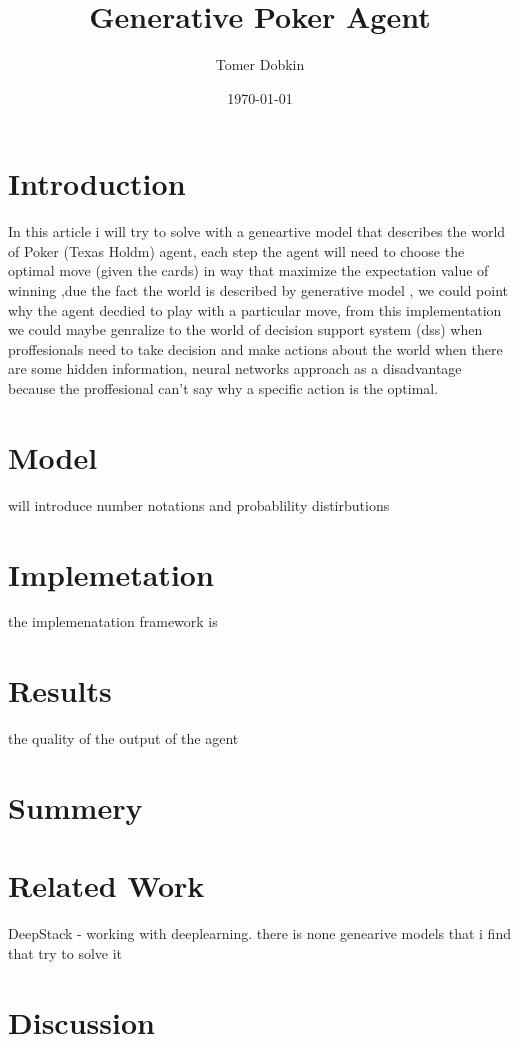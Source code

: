 \documentclass{article}
\title{Generative Poker Agent}
\author{Tomer Dobkin}
\date{\today}
\begin{document}
\maketitle
\section{Introduction}
 In this article i will try to solve with a geneartive model that describes the world of Poker (Texas Holdm)  agent, each step the agent will need to choose the optimal move (given the cards) in way that maximize the expectation value of winning  ,due the fact the world is described by generative model , we could point why the agent decdied to play with a particular move, from this implementation we could maybe genralize to the world of decision support system (dss) when proffesionals need to take decision and make actions about the world when there are some hidden information, neural networks approach as a disadvantage because the proffesional can't say why a specific action is the optimal.
\section{Model}
will introduce number notations and probablility distirbutions
\section{Implemetation}
the implemenatation framework is
\section{Results}
the quality of the output of the agent
\section{Summery}
\section{Related Work}
DeepStack - working with deeplearning.
there is none genearive models that i find that try to solve it
\section{Discussion}
\end{document}
